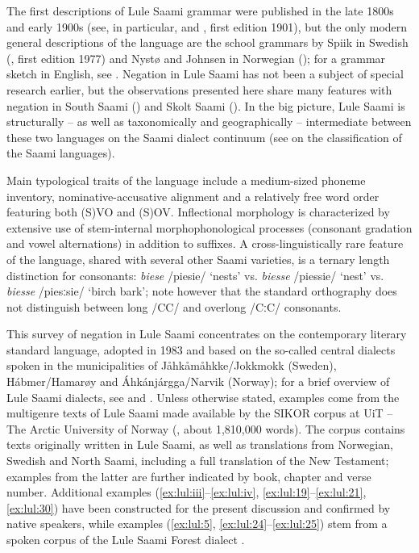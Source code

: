 \documentclass[output=paper,colorlinks,citecolor=brown]{langscibook}
\begin{document}
The first descriptions of Lule Saami grammar were published in the late 1800s and early 1900s (see, in particular, \citealt{Wiklund1891} and \citeyear{Wiklund1915}, first edition 1901), but the only modern general descriptions of the language are the school grammars by Spiik in Swedish (\citeyear{Spiik1989}, first edition 1977) and Nystø and Johnsen in Norwegian (\citeyear{NystøJohnsen2011}); for a grammar sketch in English, see \citet{Ylikoski2022}. Negation in Lule Saami has not been a subject of special research earlier, but the observations presented here share many features with negation in South Saami (\citealt{BloklandInaba2015}) and Skolt Saami (\citealt{MiestamoKoponen2015}). In the big picture, Lule Saami is structurally – as well as taxonomically and geographically – intermediate between these two languages on the Saami dialect continuum (see \citealt[6--38]{Sammallahti1998} on the classification of the Saami languages).

Main typological traits of the language include a medium-sized phoneme inventory, nominative-accusative alignment and a relatively free word order featuring both (S)VO and (S)OV. Inflectional morphology is characterized by extensive use of stem-internal morphophonological processes (consonant gradation and vowel alternations) in addition to suffixes. A cross-linguistically rare feature of the language, shared with several other Saami varieties, is a ternary length distinction for consonants: \textit{biese} /piesie/ ‘nests’ vs. \textit{biesse} /piessie/ ‘nest’ vs. \textit{biesse} /piesːsie/ ‘birch bark’; note however that the standard orthography does not distinguish between long /CC/ and overlong /CːC/ consonants.

This survey of negation in Lule Saami concentrates on the contemporary literary standard language, adopted in 1983 and based on the so\nobreakdash-called central dialects spoken in the municipalities of Jåhkåmåhkke/Jokkmokk (Sweden), Hábmer/Hamarøy and Áhkánjárgga/Narvik (Norway); for a brief overview of Lule Saami dialects, see \citet[21--22]{Sammallahti1998} and \citet[130--132]{Ylikoski2022}. Unless otherwise stated, examples come from the multigenre texts of Lule Saami made available by the SIKOR corpus at UiT – The Arctic University of Norway (\citealt{SIKOR2021}, about 1,810,000 words). The corpus contains texts originally written in Lule Saami, as well as translations from Norwegian, Swedish and North Saami, including a full translation of the New Testament; examples from the latter are further indicated by book, chapter and verse number. Additional examples (\ref{ex:lul:iii}--\ref{ex:lul:iv}, \ref{ex:lul:19}--\ref{ex:lul:21}, \ref{ex:lul:30}) have been constructed for the present discussion and confirmed by native speakers, while examples (\ref{ex:lul:5}, \ref{ex:lul:24}--\ref{ex:lul:25}) stem from a spoken corpus of the Lule Saami Forest dialect \citep{KejonenFC}.
\end{document}
